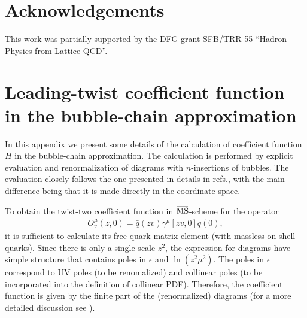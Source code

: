 \section*{Acknowledgements}

This  work  was  partially  supported  by  the  DFG grant SFB/TRR-55 ``Hadron Physics from Lattice QCD''.



\appendix 


%
\section{Leading-twist coefficient function in the bubble-chain approximation}
\label{App:H} 
%

In this appendix we present some details of the calculation of coefficient function $H$ in the bubble-chain approximation. The calculation is performed by explicit evaluation and renormalization of diagrams with $n$-insertions of bubbles. The evaluation closely follows the one presented in details in refs.\cite{Beneke:1995pq,Scimemi:2016ffw}, with the main difference being that it is made directly in the coordinate space.

To obtain the twist-two coefficient function in $\MSbar$-scheme for the operator
\begin{eqnarray}
O_v^\mu(z,0)=\bar q(z v)\gamma^\mu [zv,0]q(0),
\end{eqnarray}
it is sufficient to calculate its free-quark matrix element (with massless on-shell quarks). Since there is only a single scale $z^2$, the expression for diagrams have simple structure that contains poles in $\epsilon$ and $\ln(z^2\mu^2)$. The poles in $\epsilon$ correspond to UV poles (to be renomalized) and collinear poles (to be incorporated into the definition of collinear PDF). Therefore, the coefficient function is given by the finite part of the (renormalized) diagrams (for a more detailed discussion see \cite{Echevarria:2016scs,Scimemi:2016ffw}).

